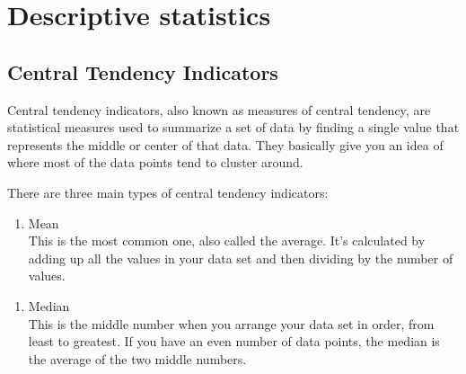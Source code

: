 \documentclass[
]{book}
\newenvironment{Shaded}{\begin{snugshade}}{\end{snugshade}}
\newcommand{\AttributeTok}[1]{\textcolor[rgb]{0.13,0.29,0.53}{#1}}
\newcommand{\CommentTok}[1]{\textcolor[rgb]{0.56,0.35,0.01}{\textit{#1}}}
\newcommand{\FunctionTok}[1]{\textcolor[rgb]{0.13,0.29,0.53}{\textbf{#1}}}
\newcommand{\NormalTok}[1]{#1}
\newcommand{\SpecialCharTok}[1]{\textcolor[rgb]{0.81,0.36,0.00}{\textbf{#1}}}
\newcommand{\StringTok}[1]{\textcolor[rgb]{0.31,0.60,0.02}{#1}}
\providecommand{\tightlist}{%
  \setlength{\itemsep}{0pt}\setlength{\parskip}{0pt}}
\begin{document}
\hypertarget{descriptive-statistics}{%
\chapter{Descriptive statistics}\label{descriptive-statistics}}

\hypertarget{central-tendency-indicators}{%
\section{Central Tendency Indicators}\label{central-tendency-indicators}}

Central tendency indicators, also known as measures of central tendency, are statistical measures used to summarize a set of data by finding a single value that represents the middle or center of that data. They basically give you an idea of where most of the data points tend to cluster around.

There are three main types of central tendency indicators:

\begin{enumerate}
\def\labelenumi{\arabic{enumi}.}
\tightlist
\item
  Mean\\
  This is the most common one, also called the average. It's calculated by adding up all the values in your data set and then dividing by the number of values.\\
\end{enumerate}

\begin{Shaded}
\end{Shaded}

\begin{enumerate}
\def\labelenumi{\arabic{enumi}.}
\setcounter{enumi}{1}
\tightlist
\item
  Median\\
  This is the middle number when you arrange your data set in order, from least to greatest. If you have an even number of data points, the median is the average of the two middle numbers.\\
\end{enumerate}
\end{document}
